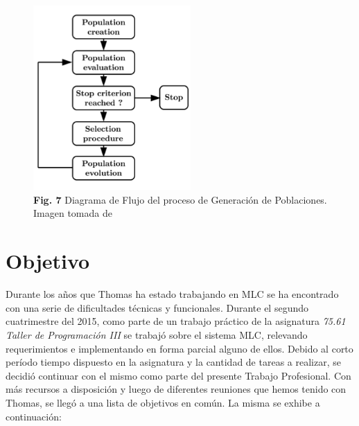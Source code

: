 \documentclass[a4paper,10pt]{article}
\begin{document}
        \begin{figure}[!Hhtb]
            \centering
            \includegraphics[width=6cm,origin=c]{Imagenes/flow_diagram.png}
            \caption{\textbf{Fig. 7} Diagrama de Flujo del proceso de Generación de Poblaciones.
            Imagen tomada de \cite{Duriez2016}} \label{fig007}
        \end{figure}

    \newpage
    \section{Objetivo}
        Durante los años que Thomas ha estado trabajando en MLC se ha encontrado con una serie de dificultades técnicas y
        funcionales. Durante el segundo cuatrimestre del 2015, como parte de un trabajo práctico de la asignatura \textit{75.61 Taller de
        Programación III} se trabajó sobre el sistema MLC, relevando requerimientos e implementando en forma parcial alguno de ellos.
        Debido al corto período tiempo dispuesto en la asignatura y la cantidad de tareas a realizar, se decidió continuar con el mismo
        como parte del presente Trabajo Profesional. Con más recursos a disposición y luego de diferentes reuniones que hemos tenido con
        Thomas, se llegó a una lista de objetivos en común. La misma se exhibe a continuación:
\end{document}
